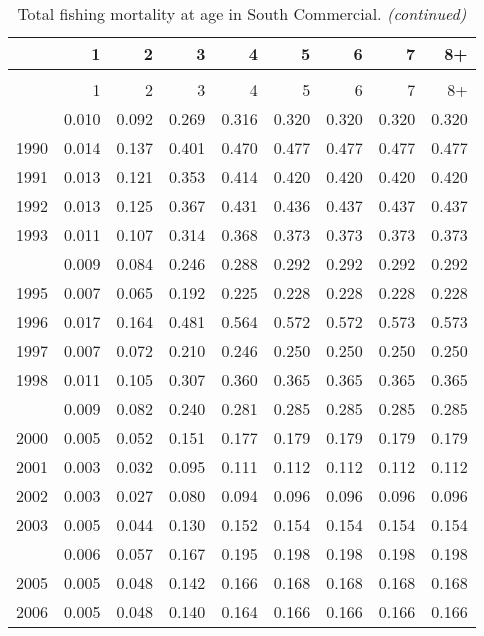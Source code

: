 \documentclass[
]{article}
\begin{document}
\begin{longtable}[t]{lrrrrrrrr}
\caption{\label{tab:South_Commercial-fleet-FAA-table}Total fishing mortality at age in South Commercial.}\\
\toprule
  & 1 & 2 & 3 & 4 & 5 & 6 & 7 & 8+\\
\midrule
\endfirsthead
\caption[]{Total fishing mortality at age in South Commercial. \textit{(continued)}}\\
\toprule
  & 1 & 2 & 3 & 4 & 5 & 6 & 7 & 8+\\
\midrule
\endhead

\endfoot
\bottomrule
\endlastfoot
1989 & 0.010 & 0.092 & 0.269 & 0.316 & 0.320 & 0.320 & 0.320 & 0.320\\
1990 & 0.014 & 0.137 & 0.401 & 0.470 & 0.477 & 0.477 & 0.477 & 0.477\\
1991 & 0.013 & 0.121 & 0.353 & 0.414 & 0.420 & 0.420 & 0.420 & 0.420\\
1992 & 0.013 & 0.125 & 0.367 & 0.431 & 0.436 & 0.437 & 0.437 & 0.437\\
1993 & 0.011 & 0.107 & 0.314 & 0.368 & 0.373 & 0.373 & 0.373 & 0.373\\
\addlinespace
1994 & 0.009 & 0.084 & 0.246 & 0.288 & 0.292 & 0.292 & 0.292 & 0.292\\
1995 & 0.007 & 0.065 & 0.192 & 0.225 & 0.228 & 0.228 & 0.228 & 0.228\\
1996 & 0.017 & 0.164 & 0.481 & 0.564 & 0.572 & 0.572 & 0.573 & 0.573\\
1997 & 0.007 & 0.072 & 0.210 & 0.246 & 0.250 & 0.250 & 0.250 & 0.250\\
1998 & 0.011 & 0.105 & 0.307 & 0.360 & 0.365 & 0.365 & 0.365 & 0.365\\
\addlinespace
1999 & 0.009 & 0.082 & 0.240 & 0.281 & 0.285 & 0.285 & 0.285 & 0.285\\
2000 & 0.005 & 0.052 & 0.151 & 0.177 & 0.179 & 0.179 & 0.179 & 0.179\\
2001 & 0.003 & 0.032 & 0.095 & 0.111 & 0.112 & 0.112 & 0.112 & 0.112\\
2002 & 0.003 & 0.027 & 0.080 & 0.094 & 0.096 & 0.096 & 0.096 & 0.096\\
2003 & 0.005 & 0.044 & 0.130 & 0.152 & 0.154 & 0.154 & 0.154 & 0.154\\
\addlinespace
2004 & 0.006 & 0.057 & 0.167 & 0.195 & 0.198 & 0.198 & 0.198 & 0.198\\
2005 & 0.005 & 0.048 & 0.142 & 0.166 & 0.168 & 0.168 & 0.168 & 0.168\\
2006 & 0.005 & 0.048 & 0.140 & 0.164 & 0.166 & 0.166 & 0.166 & 0.166\\

\end{longtable}
\end{document}
